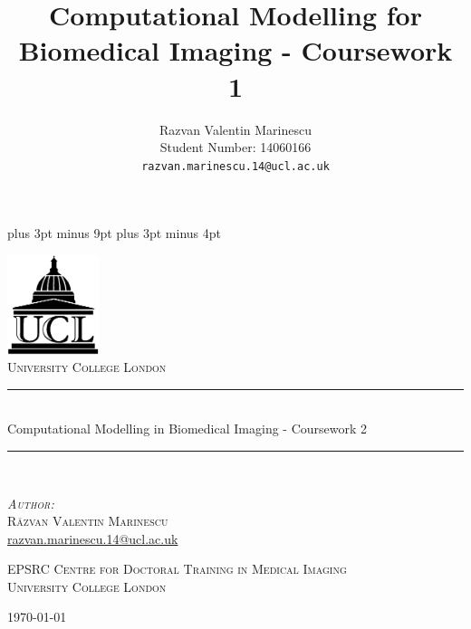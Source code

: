 \documentclass[11pt,a4paper,oneside]{report}
\title{Computational Modelling for Biomedical Imaging - Coursework 1}
\author{
Razvan Valentin Marinescu\\
Student Number: 14060166\\
\texttt{razvan.marinescu.14@ucl.ac.uk}
}
\begin{document}
\belowdisplayskip=12pt plus 3pt minus 9pt
\belowdisplayshortskip=7pt plus 3pt minus 4pt

\begin{titlepage}
\begin{center}

\includegraphics[width=0.2\textwidth]{ucl-logo2}~\\[1cm]

\textsc{\LARGE University College London}\\[1.5cm]


\newcommand{\HRule}{\rule{\linewidth}{0.5mm}}

\HRule \\[0.4cm]
{ \LARGE Computational Modelling in Biomedical Imaging - Coursework 2 \\[0.4cm] }

\HRule \\[1.5cm]

\begin{minipage}{0.4\textwidth}
\begin{center}
\textsc{\large
\emph{Author:}\\
R\u{a}zvan Valentin \textsc{Marinescu}}\\
\href{razvan.marinescu.14@ucl.ac.uk}{razvan.marinescu.14@ucl.ac.uk}\\

\end{center}
\end{minipage}

\vfill
\vfill
\vfill
\textsc{\large
EPSRC Centre for Doctoral Training in Medical Imaging\\ University College London}

\vfill

{\large \today}

\end{center}
\end{titlepage}
\end{document}
